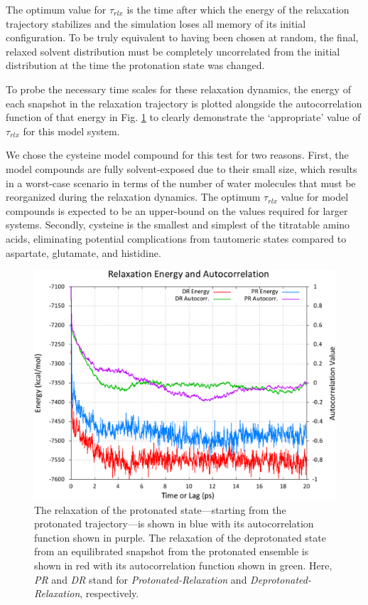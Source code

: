The optimum value for $\tau _ {rlx}$ is the time after which the energy of the
relaxation trajectory stabilizes and the simulation loses all memory of its
initial configuration. To be truly equivalent to having been chosen at random,
the final, relaxed solvent distribution must be completely uncorrelated from the
initial distribution at the time the protonation state was changed.

To probe the necessary time scales for these relaxation dynamics, the energy of
each snapshot in the relaxation trajectory is plotted alongside the
autocorrelation function of that energy in Fig. \ref{fig4:ntrelax_and_autocorr}
to clearly demonstrate the `appropriate' value of $\tau _ {rlx}$ for this model
system.

We chose the cysteine model compound for this test for two reasons. First, the
model compounds are fully solvent-exposed due to their small size, which results
in a worst-case scenario in terms of the number of water molecules that must be
reorganized during the relaxation dynamics. The optimum $\tau _ {rlx}$ value
for model compounds is expected to be an upper-bound on the values required for
larger systems. Secondly, cysteine is the smallest and simplest of the
titratable amino acids, eliminating potential complications from tautomeric
states compared to aspartate, glutamate, and histidine.

\begin{figure}
   \includegraphics[width=6in]{Cys_ntrelax_energies.eps}
   \caption{The relaxation of the protonated state---starting from the
            protonated trajectory---is shown in blue with its autocorrelation
            function shown in purple. The relaxation of the deprotonated state
            from an equilibrated snapshot from the protonated ensemble is shown
            in red with its autocorrelation function shown in green. Here,
            \emph{PR} and \emph{DR} stand for \emph{Protonated-Relaxation} and
            \emph{Deprotonated-Relaxation}, respectively.}
   \label{fig4:ntrelax_and_autocorr}
\end{figure}

